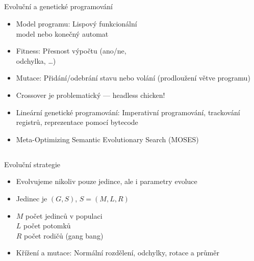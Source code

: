 \documentclass{beamer}
\begin{document}
\subsection{}
\begin{frame}{Evoluční a genetické programování}
\begin{itemize}
\item Model programu: Lispový funkcionální \\ model nebo konečný automat
\item Fitness: Přesnost výpočtu (ano/ne, \\ odchylka, \dots)
\item Mutace: Přidání/odebrání stavu nebo volání (prodloužení větve programu)
\item Crossover je problematický --- headless chicken!
\item Lineární genetické programování: Imperativní programování, trackování registrů, reprezentace pomocí bytecode
\item Meta-Optimizing Semantic Evolutionary Search (MOSES)
\end{itemize}
\end{frame}

\subsection{}
\begin{frame}{Evoluční strategie}
\begin{itemize}
\item Evolvujeme nikoliv pouze jedince, ale i parametry evoluce
\item Jedinec je $(G,S)$, $S=(M,L,R)$
\item $M$ počet jedinců v populaci \\ $L$ počet potomků \\ $R$ počet rodičů (gang bang)
\item Křížení a mutace: Normální rozdělení, odchylky, rotace a průměr
\end{itemize}
\end{frame}
\end{document}
